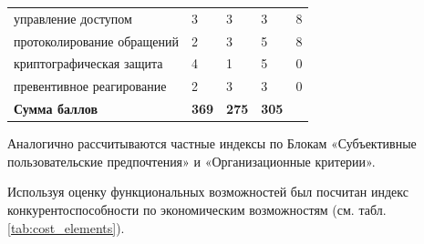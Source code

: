 \begin{longtable}{ x{5cm}x{2cm}x{2cm}x{2cm}x{2cm} }
	управление доступом                                                      & 3                      & 3                       & 3                       & 8                 \\
	протоколирование обращений                                               & 2                      & 3                       & 5                       & 8                 \\
	криптографическая защита                                                 & 4                      & 1                       & 5                       & 0                 \\
	превентивное реагирование                                                & 2                      & 3                       & 3                       & 0                 \\
	\midrule
	\textbf{Сумма баллов}                                                    & \textbf{369}           & \textbf{275}            & \textbf{305}            &                   \\
	\bottomrule
	
\end{longtable}

Аналогично рассчитываются частные индексы по Блокам «Субъективные пользовательские предпочтения» и «Организационные критерии».

Используя оценку функциональных возможностей был посчитан индекс конкурентоспособности по экономическим возможностям (см. табл. \ref{tab:cost_elements}).

